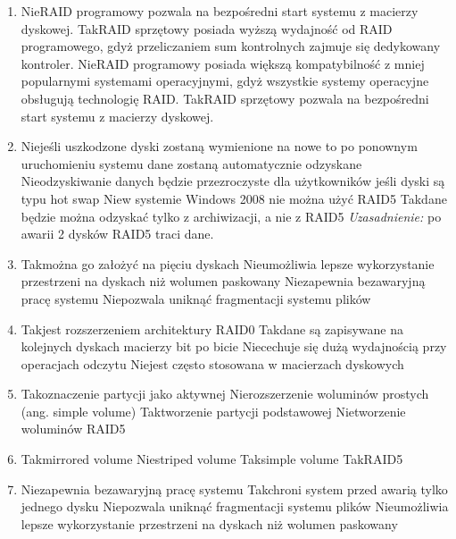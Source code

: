 \begin{enumerate}
		\newpage
		\item {}%
		{Nie}{RAID programowy pozwala na bezpośredni start systemu z macierzy dyskowej.}%
		{Tak}{RAID sprzętowy posiada wyższą wydajność od RAID programowego, gdyż przeliczaniem sum kontrolnych zajmuje się dedykowany kontroler.}%
		{Nie}{RAID programowy posiada większą kompatybilność z mniej popularnymi systemami operacyjnymi, gdyż wszystkie systemy operacyjne obsługują technologię RAID.}%
		{Tak}{RAID sprzętowy pozwala na bezpośredni start systemu z macierzy dyskowej.}
		\item {}
		{Nie}{jeśli uszkodzone dyski zostaną wymienione na nowe to po ponownym uruchomieniu systemu dane zostaną automatycznie odzyskane}
		{Nie}{odzyskiwanie danych będzie przezroczyste dla użytkowników jeśli dyski są typu hot swap}
		{Nie}{w systemie Windows 2008 nie można użyć RAID5}
		{Tak}{dane będzie można odzyskać tylko z archiwizacji, a nie z RAID5}
		{\small \emph{Uzasadnienie:} po awarii 2 dysków RAID5 traci dane.}
		\item {}%
		{Tak}{można go założyć na pięciu dyskach}%
		{Nie}{umożliwia lepsze wykorzystanie przestrzeni na dyskach niż wolumen paskowany}%
		{Nie}{zapewnia bezawaryjną pracę systemu}%
		{Nie}{pozwala uniknąć fragmentacji systemu plików}
		\item {}%
		{Tak}{jest rozszerzeniem architektury RAID0}%
		{Tak}{dane są zapisywane na kolejnych dyskach macierzy bit po bicie}%
		{Nie}{cechuje się dużą wydajnością przy operacjach odczytu}%
		{Nie}{jest często stosowana w macierzach dyskowych}
		\item {}%
		{Tak}{oznaczenie partycji jako aktywnej}%
		{Nie}{rozszerzenie woluminów prostych (ang. simple volume)}%
		{Tak}{tworzenie partycji podstawowej}%
		{Nie}{tworzenie woluminów RAID5}
		\item {}%
		{Tak}{mirrored volume}%
		{Nie}{striped volume}%
		{Tak}{simple volume}%
		{Tak}{RAID5}
		\item {}%
		{Nie}{zapewnia bezawaryjną pracę systemu}%
		{Tak}{chroni system przed awarią tylko jednego dysku}%
		{Nie}{pozwala uniknąć fragmentacji systemu plików}%
		{Nie}{umożliwia lepsze wykorzystanie przestrzeni na dyskach niż wolumen paskowany}%
		
		
	\end{enumerate}